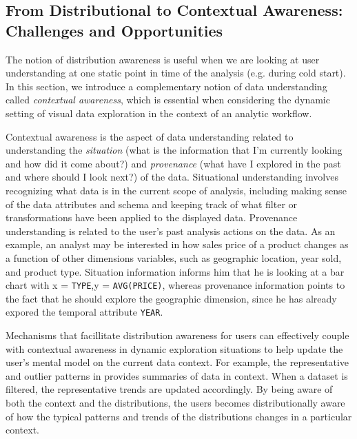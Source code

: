 \subsection{From Distributional to Contextual Awareness: Challenges and Opportunities}
\par The notion of distribution awareness is useful when we are looking at user understanding at one static point in time of the analysis (e.g. during cold start). In this section, we introduce a complementary notion of data understanding called \textit{contextual awareness}, which is essential when considering the dynamic setting of visual data exploration in the context of an analytic workflow.
\par Contextual awareness is the aspect of data understanding related to understanding the \textit{situation} (what is the information that I'm currently looking and how did it come about?) and \textit{provenance} (what have I explored in the past and where should I look next?) of the data. Situational understanding involves recognizing what data is in the current scope of analysis, including making sense of the data attributes and schema and keeping track of what filter or transformations have been applied to the displayed data. Provenance understanding is related to the user's past analysis actions on the data. As an example, an analyst may be interested in how sales price of a product changes as a function of other dimensions variables, such as geographic location, year sold, and product type. Situation information informs him that he is looking at a bar chart with x = \texttt{TYPE},y = \texttt{AVG(PRICE)}, whereas provenance information points to the fact that he should explore the geographic dimension, since he has already expored the temporal attribute \texttt{YEAR}.
\par Mechanisms that facillitate distribution awareness for users can effectively couple with contextual awareness in dynamic exploration situations to help update the user's mental model on the current data context. For example, the representative and outlier patterns in \zv provides summaries of data in context. When a dataset is filtered, the representative trends are updated accordingly. By being aware of both the context and the distributions, the users becomes distributionally aware of how the typical patterns and trends of the distributions changes in a particular context. %
